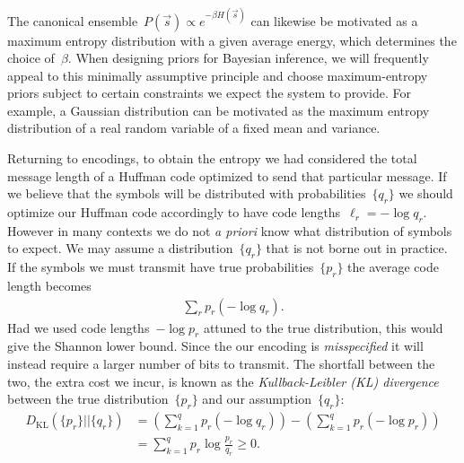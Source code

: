 The canonical ensemble~$P(\vec{s}) \propto e^{-\beta H(\vec{s})}$ can likewise be motivated as a maximum entropy distribution with a given average energy, which determines the choice of~$\beta$. When designing priors for Bayesian inference, we will frequently appeal to this minimally assumptive principle and choose maximum-entropy priors subject to certain constraints we expect the system to provide. For example, a Gaussian distribution can be motivated as the maximum entropy distribution of a real random variable of a fixed mean and variance. 

Returning to encodings, to obtain the entropy we had considered the total message length of a Huffman code optimized to send that particular message. If we believe that the symbols will be distributed with probabilities~$\{q_r\}$ we should optimize our Huffman code accordingly to have code lengths~$\ell_r = -\log q_r$. However in many contexts we do not \textit{a priori} know what distribution of symbols to expect. We may assume a distribution~$\{q_r\}$ that is not borne out in practice. If the symbols we must transmit have true probabilities~$\{p_r\}$ the average code length becomes \begin{align}
    \sum_r p_r (-\log q_r).
\end{align}
Had we used code lengths~$-\log p_r$ attuned to the true distribution, this would give the Shannon lower bound. Since the our encoding is \emph{misspecified} it will instead require a larger number of bits to transmit. The shortfall between the two, the extra cost we incur, is known as the \emph{Kullback-Leibler (KL) divergence} between the true distribution~$\{p_r\}$ and our assumption~$\{q_r\}$: \begin{align}
    D_{\text{KL}}(\{p_r\}||\{q_r\}) &= \left(\sum_{k=1}^q p_r (-\log q_r) \right) - \left(\sum_{k=1}^q p_r (-\log p_r) \right) \nonumber \\
    &= \sum_{k=1}^q p_r \log \frac{p_r}{q_r} \geq 0.
\end{align}

